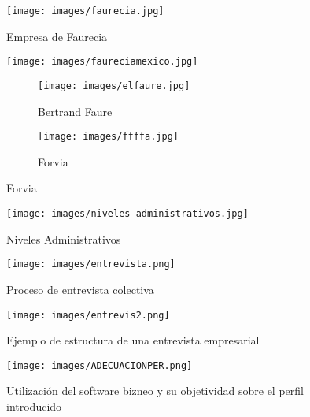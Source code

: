 \documentclass[letterpaper,12pt]{article}
\begin{document}
\begin{sloppypar}
\begin{figure}[H]
    \centering
    \texttt{[image: images/faurecia.jpg]}
    \caption{Empresa de Faurecia}
    \label{fig: 1 }
    \texttt{[image: images/faureciamexico.jpg]}
    \caption{Faurecia México}
    \label{fig: 2}
    \begin{subfigure}{0.3\textwidth}
        \texttt{[image: images/elfaure.jpg]}
        \caption{Bertrand Faure}
        \label{fig: 3}  
    \end{subfigure}
    \begin{subfigure}{0.4\textwidth}
        \texttt{[image: images/ffffa.jpg]}
        \caption{Forvia}
        \label{fig:4}
    \end{subfigure}
\end{figure}
\newpage
\begin{figure}[H]
    \centering
    \texttt{[image: images/niveles administrativos.jpg]}
    \caption{Niveles Administrativos}
    \label{fig:5}
    \texttt{[image: images/entrevista.png]}
    \caption{Proceso de entrevista colectiva}
    \label{fig:6}
    \texttt{[image: images/entrevis2.png]}
    \caption{Ejemplo de estructura de una entrevista empresarial}
    \label{fig:7}
\end{figure}
\newpage
\begin{figure}[H]
    \centering 
    \texttt{[image: images/ADECUACIONPER.png]}
    \caption{Utilización del software bizneo y su objetividad sobre el perfil introducido}
\end{figure}


\end{sloppypar}
\end{document}
